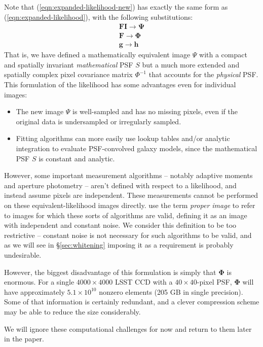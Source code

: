 \documentclass[10pt]{article}
\newcommand{\eqnref}[1]{(\ref{eqn:#1})}
\newcommand{\secref}[1]{\S\ref{sec:#1}}
\begin{document}
Note that \eqnref{expanded-likelihood-new} has exactly the same form as \eqnref{expanded-likelihood}, with the following substitutions:
\begin{align}
\bm{F}\bm{I} \longrightarrow  \bm{\Psi} \label{eqn:image-translate} \\
\bm{F} \longrightarrow \bm{\Phi} \label{eqn:covar-translate} \\
\bm{g} \longrightarrow \bm{h} \label{eqn:model-translate}
\end{align}
That is, we have defined a mathematically equivalent image $\Psi$ with a compact and spatially invariant \emph{mathematical} PSF $S$ but a much more extended and spatially complex pixel covariance matrix $\Phi^{-1}$ that accounts for the \emph{physical} PSF.  This formulation of the likelihood has some advantages even for individual images:
\begin{itemize}
\item The new image $\Psi$ is well-sampled and has no missing pixels, even if the original data is undersampled or irregularly sampled.
\item Fitting algorithms can more easily use lookup tables and/or analytic integration to evaluate PSF-convolved galaxy models, since the mathematical PSF $S$ is constant and analytic.
\end{itemize}

However, some important measurement algorithms -- notably adaptive moments and aperture photometry -- aren't defined with respect to a likelihood, and instead assume pixels are independent.  These measurements cannot be performed on these equivalent-likelihood images directly.  \cite{2015arXiv151206879Z} use the term \emph{proper image} to refer to images for which these sorts of algorithms are valid, defining it as an image with independent and constant noise.  We consider this definition to be too restrictive -- constant noise is not necessary for such algorithms to be valid, and as we will see in \secref{whitening} imposing it as a requirement is probably undesirable.

However, the biggest disadvantage of this formulation is simply that $\bm{\Phi}$ is enormous.  For a single $4000 \times 4000$ LSST CCD with a $40\times 40$-pixel PSF, $\bm{\Phi}$ will have approximately $5.1\times 10^{10}$ nonzero elements (205 GB in single precision).  Some of that information is certainly redundant, and a clever compression scheme may be able to reduce the size considerably.

We will ignore these computational challenges for now and return to them later in the paper.
\end{document}
